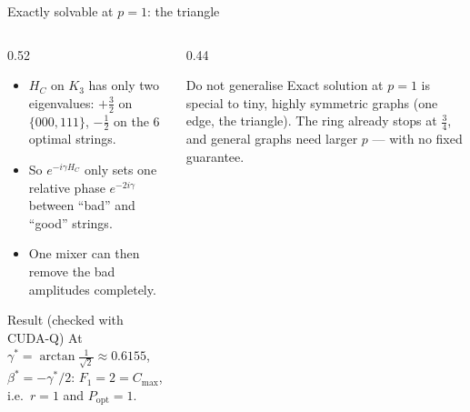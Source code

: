 \documentclass[aspectratio=169,11pt]{beamer}
\begin{document}
\begin{frame}{Exactly solvable at $p = 1$: the triangle}
  \begin{columns}[T]
    \begin{column}{0.52\textwidth}
      \begin{itemize}
        \item $H_C$ on $K_3$ has only two eigenvalues: $+\frac32$ on $\{000, 111\}$, $-\frac12$ on the 6 optimal strings.
        \item So $e^{-i\gamma H_C}$ only sets one relative phase $e^{-2i\gamma}$ between ``bad'' and ``good'' strings.
        \item One mixer can then remove the bad amplitudes completely.
      \end{itemize}
      \begin{exampleblock}{Result (checked with CUDA-Q)}
        At $\gamma^* = \arctan\frac{1}{\sqrt2} \approx 0.6155$, $\beta^* = -\gamma^*/2$: $F_1 = 2 = C_{\max}$, i.e.\ $r = 1$ and
        $P_{\text{opt}} = 1$.
      \end{exampleblock}
    \end{column}
    \begin{column}{0.44\textwidth}
      \begin{alertblock}{Do not generalise}
        Exact solution at $p = 1$ is special to tiny, highly symmetric graphs (one edge, the triangle). The ring already
        stops at $\frac34$, and general graphs need larger $p$ --- with no fixed guarantee.
      \end{alertblock}
    \end{column}
  \end{columns}
\end{frame}

\end{document}
